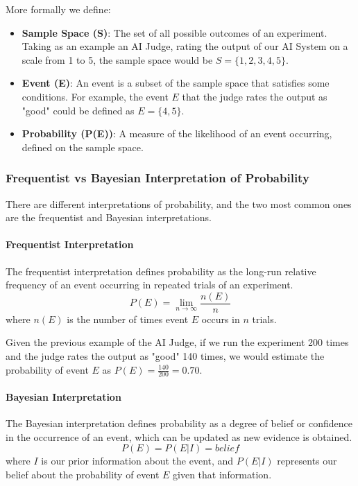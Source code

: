 More formally we define:
\begin{itemize}
    \item \textbf{Sample Space (S)}: The set of all possible outcomes of an experiment.
    Taking as an example an AI Judge, rating the output of our AI System on a scale from 1 to 5, the sample space would be $S = \{1, 2, 3, 4, 5\}$.
    \item \textbf{Event (E)}: An event is a subset of the sample space that satisfies some conditions.
    For example, the event $E$ that the judge rates the output as "good" could be defined as $E = \{4, 5\}$.
    \item \textbf{Probability (P(E))}: A measure of the likelihood of an event occurring, defined on the sample space.
\end{itemize}

\subsubsection{Frequentist vs Bayesian Interpretation of Probability}
There are different interpretations of probability, and the two most common ones are the frequentist and Bayesian interpretations.

\paragraph{Frequentist Interpretation} 
The frequentist interpretation defines probability as the long-run relative frequency of an event occurring in repeated trials of an experiment.
\[ P(E) = \lim_{n \to \infty} \frac{n(E)}{n} \]
where $n(E)$ is the number of times event $E$ occurs in $n$ trials.

Given the previous example of the AI Judge, if we run the experiment 200 times and the judge rates the output as "good" 140 times, 
we would estimate the probability of event $E$ as $P(E) = \frac{140}{200} = 0.70$.

\paragraph{Bayesian Interpretation}
The Bayesian interpretation defines probability as a degree of belief or confidence in the occurrence of an event, which can be updated as new evidence is obtained.
\[ P(E) = P(E | I) = belief\]
where $I$ is our prior information about the event, and $P(E | I)$ represents our belief about the probability of event $E$ given that information.


